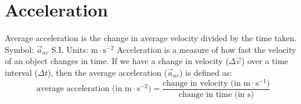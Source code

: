          \section{Acceleration}
    \nopagebreak
{} {Average acceleration is the change in average velocity divided by the time taken.\\
Symbol: $\vec{a}_{av}$\hspace{2cm} S.I. Units: $\text{m} \cdot \text{s}^{-2}$ } 
      \label{m38794*id67562}Acceleration is a measure of how fast the velocity of an object changes in time. If we have a change in velocity ($\Delta \vec{v}$) over a time interval ($\Delta t$), then the average acceleration ($\vec{a}_{av}$) is defined as:\begin{equation*}
    \text{average acceleration (in m} \cdot {\text{s}}^{-2}\text{)} =\frac{\text{change in velocity (in m} \cdot {\text{s}}^{-1}\text{)}}{\text{change in time (in s)}}
      \end{equation*}
        
